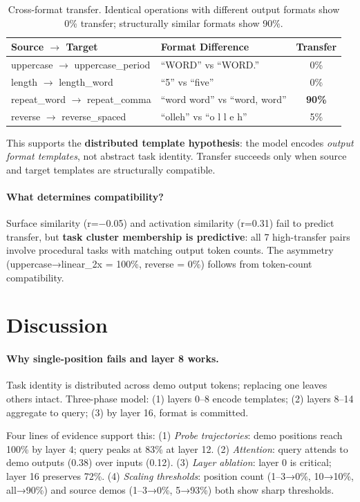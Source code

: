 \documentclass{article}
\begin{document}
\begin{table}[t]
\caption{Cross-format transfer. Identical operations with different output formats show 0\% transfer; structurally similar formats show 90\%.}
\label{tab:format}
\centering
\small
\begin{tabular}{@{}llc@{}}
\toprule
Source $\to$ Target & Format Difference & Transfer \\
\midrule
uppercase $\to$ uppercase\_period & ``WORD'' vs ``WORD.'' & 0\% \\
length $\to$ length\_word & ``5'' vs ``five'' & 0\% \\
repeat\_word $\to$ repeat\_comma & ``word word'' vs ``word, word'' & \textbf{90\%} \\
reverse $\to$ reverse\_spaced & ``olleh'' vs ``o l l e h'' & 5\% \\
\bottomrule
\end{tabular}
\end{table}

This supports the \textbf{distributed template hypothesis}: the model encodes \emph{output format templates}, not abstract task identity. Transfer succeeds only when source and target templates are structurally compatible.

\paragraph{What determines compatibility?} Surface similarity (r=$-$0.05) and activation similarity (r=0.31) fail to predict transfer, but \textbf{task cluster membership is predictive}: all 7 high-transfer pairs involve procedural tasks with matching output token counts. The asymmetry (uppercase→linear\_2x = 100\%, reverse = 0\%) follows from token-count compatibility.

\section{Discussion}

\paragraph{Why single-position fails and layer 8 works.}
Task identity is distributed across demo output tokens; replacing one leaves others intact. Three-phase model: (1) layers 0--8 encode templates; (2) layers 8--14 aggregate to query; (3) by layer 16, format is committed.

Four lines of evidence support this: (1) \emph{Probe trajectories}: demo positions reach 100\% by layer 4; query peaks at 83\% at layer 12. (2) \emph{Attention}: query attends to demo outputs (0.38) over inputs (0.12). (3) \emph{Layer ablation}: layer 0 is critical; layer 16 preserves 72\%. (4) \emph{Scaling thresholds}: position count (1--3→0\%, 10→10\%, all→90\%) and source demos (1--3→0\%, 5→93\%) both show sharp thresholds.
\end{document}
